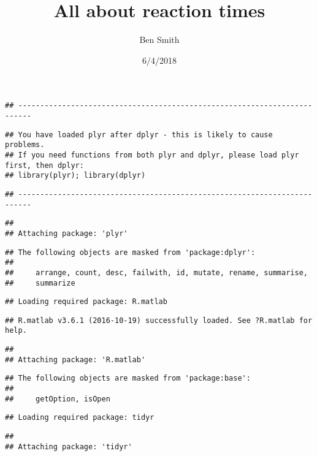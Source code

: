 \documentclass[]{article}
\title{All about reaction times}
\author{Ben Smith}
\date{6/4/2018}
\begin{document}
\maketitle

\begin{verbatim}
## -------------------------------------------------------------------------
\end{verbatim}

\begin{verbatim}
## You have loaded plyr after dplyr - this is likely to cause problems.
## If you need functions from both plyr and dplyr, please load plyr first, then dplyr:
## library(plyr); library(dplyr)
\end{verbatim}

\begin{verbatim}
## -------------------------------------------------------------------------
\end{verbatim}

\begin{verbatim}
## 
## Attaching package: 'plyr'
\end{verbatim}

\begin{verbatim}
## The following objects are masked from 'package:dplyr':
## 
##     arrange, count, desc, failwith, id, mutate, rename, summarise,
##     summarize
\end{verbatim}

\begin{verbatim}
## Loading required package: R.matlab
\end{verbatim}

\begin{verbatim}
## R.matlab v3.6.1 (2016-10-19) successfully loaded. See ?R.matlab for help.
\end{verbatim}

\begin{verbatim}
## 
## Attaching package: 'R.matlab'
\end{verbatim}

\begin{verbatim}
## The following objects are masked from 'package:base':
## 
##     getOption, isOpen
\end{verbatim}

\begin{verbatim}
## Loading required package: tidyr
\end{verbatim}

\begin{verbatim}
## 
## Attaching package: 'tidyr'
\end{verbatim}
\end{document}
